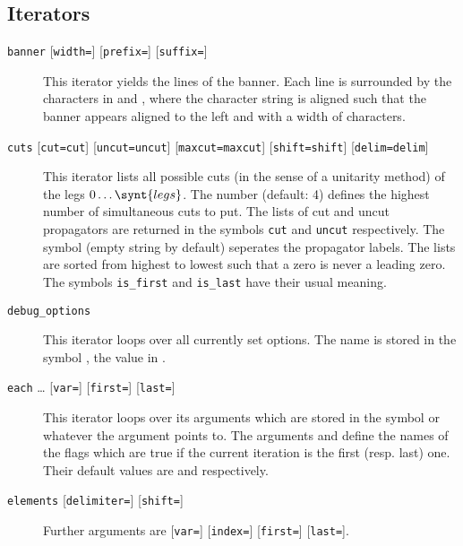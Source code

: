 \documentclass[11pt,a4paper]{refrep}
\begin{document}
\subsection{Iterators}
\begin{description}
\item[\texttt{banner}
   {[\texttt{width=}]}
   {[\texttt{prefix=}]}
   {[\texttt{suffix=}]}]
   This iterator yields the lines of the banner. Each line is surrounded
   by the characters in  and , where the
    character string is aligned such that the banner
   appears aligned to the left and with a width of  characters.
\item[\texttt{cuts} 
   {[\texttt{cut=}\texttt{cut}]}
   {[\texttt{uncut=}\texttt{uncut}]}
   {[\texttt{maxcut=}\texttt{maxcut}]}
   {[\texttt{shift=}\texttt{shift}]}
   {[\texttt{delim=}\texttt{delim}]}]
   This iterator lists all possible cuts (in the sense of a unitarity
   method) of the legs $0\dots\synt{legs}$. The number 
   (default: 4) defines the highest number of simultaneous cuts to put.
   The lists of cut and uncut propagators are returned in the symbols
   \texttt{cut} and \texttt{uncut} respectively. The symbol 
   (empty string by default) seperates the propagator labels. The lists
   are sorted from highest to lowest such that a zero is never a leading
   zero.
   The symbols \texttt{is\_first} and \texttt{is\_last} have their
   usual meaning.
\item[\texttt{debug\_options}] This iterator loops over all
   currently set options. The name is stored in the symbol ,
   the value in \lit{\$\_}.
\item[\texttt{each} \dots {}
  {[\texttt{var=}]}
   {[\texttt{first=}]}
   {[\texttt{last=}]}]
   This iterator loops over its arguments which are stored in
   the symbol \lit{\$\_} or whatever the argument  points to.
   The arguments  and  define the names of the flags
   which are true if the current iteration is the first (resp. last) one.
   Their default values are  and  respectively.
\item[\texttt{elements} 
   {[\texttt{delimiter=}]}
   {[\texttt{shift=}]}]
   Further arguments are  {[\texttt{var=}]}
   {[\texttt{index=}]}
   {[\texttt{first=}]}
   {[\texttt{last=}]}.


\end{description}
\end{document}
